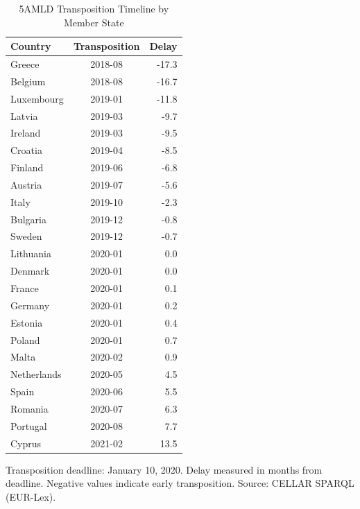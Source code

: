 \begin{table}[!h]
\centering
\caption{\label{tab:tab:transposition}5AMLD Transposition Timeline by Member State}
\centering
\begin{threeparttable}
\begin{tabular}[t]{lcr}
\toprule
Country & Transposition & Delay\\
\midrule
Greece & 2018-08 & -17.3\\
Belgium & 2018-08 & -16.7\\
Luxembourg & 2019-01 & -11.8\\
Latvia & 2019-03 & -9.7\\
Ireland & 2019-03 & -9.5\\
\addlinespace
Croatia & 2019-04 & -8.5\\
Finland & 2019-06 & -6.8\\
Austria & 2019-07 & -5.6\\
Italy & 2019-10 & -2.3\\
Bulgaria & 2019-12 & -0.8\\
\addlinespace
Sweden & 2019-12 & -0.7\\
Lithuania & 2020-01 & 0.0\\
Denmark & 2020-01 & 0.0\\
France & 2020-01 & 0.1\\
Germany & 2020-01 & 0.2\\
\addlinespace
Estonia & 2020-01 & 0.4\\
Poland & 2020-01 & 0.7\\
Malta & 2020-02 & 0.9\\
Netherlands & 2020-05 & 4.5\\
Spain & 2020-06 & 5.5\\
\addlinespace
Romania & 2020-07 & 6.3\\
Portugal & 2020-08 & 7.7\\
Cyprus & 2021-02 & 13.5\\
\bottomrule
\end{tabular}
\begin{tablenotes}
\item Transposition deadline: January 10, 2020. Delay measured in months from deadline. Negative values indicate early transposition. Source: CELLAR SPARQL (EUR-Lex).
\end{tablenotes}
\end{threeparttable}
\end{table}
